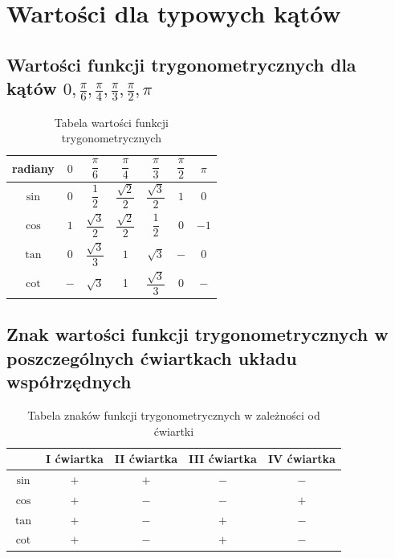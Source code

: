 \documentclass[a4paper,12pt]{article}
\begin{document}
\newpage

\section{Wartości dla typowych kątów}

\subsection{Wartości funkcji trygonometrycznych dla kątów $0, \frac{\pi}{6}, \frac{\pi}{4}, \frac{\pi}{3}, \frac{\pi}{2}, \pi$}

\bgroup
\setlength{\tabcolsep}{12pt}
\def\arraystretch{2.5}
\begin{table}[h]
\centering
    \begin{tabular}{|c|c|c|c|c|c|c|}
        \hline
        radiany & $0$ & $\dfrac{\pi}{6}$ & $\dfrac{\pi}{4}$ & $\dfrac{\pi}{3}$ & $\dfrac{\pi}{2}$ & $\pi$ \\ \hline
        $\sin$ & $0$ & $\dfrac{1}{2}$ & $\dfrac{\sqrt{2}}{2}$ & $\dfrac{\sqrt{3}}{2}$ & $1$ & $0$ \\ \hline
        $\cos$ & $1$ & $\dfrac{\sqrt{3}}{2}$ & $\dfrac{\sqrt{2}}{2}$ & $\dfrac{1}{2}$ & $0$ & $-1$ \\ \hline
        $\tan$ & $0$ & $\dfrac{\sqrt{3}}{3}$ & $1$ & $\sqrt{3}$ & $-$ & $0$ \\ \hline
        $\cot$ & $-$ & $\sqrt{3}$ & 1 & $\dfrac{\sqrt{3}}{3}$ & $0$ & $-$ \\ \hline
    \end{tabular}
    \caption{Tabela wartości funkcji trygonometrycznych}
    \label{tab:tabela-wartosci}
\end{table}
\egroup

\subsection{Znak wartości funkcji trygonometrycznych w poszczególnych ćwiartkach układu współrzędnych}

\bgroup
\setlength{\tabcolsep}{5pt}
\def\arraystretch{1.5}
\begin{table}[h]
\centering
    \begin{tabular}{|c|c|c|c|c|}
        \hline
         & I ćwiartka & II ćwiartka & III ćwiartka & IV ćwiartka \\ \hline
        $\sin$ & $+$ & $+$ & $-$ & $-$ \\ \hline
        $\cos$ & $+$ & $-$ & $-$ & $+$ \\ \hline
        $\tan$ & $+$ & $-$ & $+$ & $-$ \\ \hline
        $\cot$ & $+$ & $-$ & $+$ & $-$ \\ \hline
    \end{tabular}
    \caption{Tabela znaków funkcji trygonometrycznych w zależności od ćwiartki}
    \label{tab:tabela-znakow-funkcji}
\end{table}
\egroup
\end{document}
